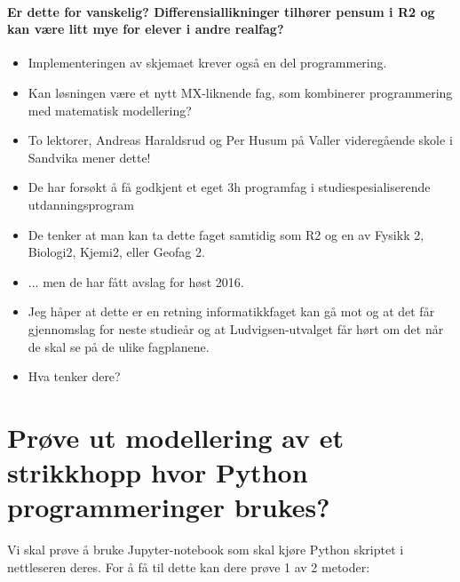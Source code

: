 \documentclass[%
oneside,                 %
final,                   %
10pt]{article}
\begin{document}
\noindent

\paragraph{Er dette for vanskelig? Differensiallikninger tilhører pensum i R2 og kan være litt mye for elever i andre realfag?}
\begin{itemize}
\item Implementeringen av skjemaet krever også en del programmering.
\end{itemize}

\noindent
\begin{itemize}
\item Kan løsningen være et nytt MX-liknende fag, som kombinerer programmering med matematisk modellering?

\item To lektorer, Andreas Haraldsrud og Per Husum på Valler videregående skole i Sandvika mener dette!

\item De har forsøkt å få godkjent et eget 3h programfag i studiespesialiserende utdanningsprogram

\item De tenker at man kan ta dette faget samtidig som R2 og en av Fysikk 2, Biologi2, Kjemi2, eller Geofag 2.

\item ... men de har fått avslag for høst 2016.

\item Jeg håper at dette er en retning informatikkfaget kan gå mot og at det får gjennomslag for neste studieår og at Ludvigsen-utvalget får hørt om det når de skal se på de ulike fagplanene.

\item Hva tenker dere?
\end{itemize}

\noindent


\section{Prøve ut modellering av et strikkhopp hvor Python programmeringer brukes?}

Vi skal prøve å bruke Jupyter-notebook som skal kjøre Python skriptet i nettleseren deres. For å få til dette kan dere prøve 1 av 2 metoder:
\end{document}
